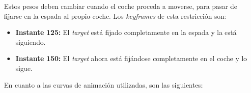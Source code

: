 \bigskip

Estos pesos deben cambiar cuando el coche proceda a moverse, para pasar de fijarse en la espada al propio coche. Los \textit{keyframes} de esta restricción son:

\begin{itemize}
    \item \textbf{Instante 125: }El \textit{target} está fijado completamente en la espada y la está siguiendo.
    \item \textbf{Instante 150: }El \textit{target} ahora está fijándose completamente en el coche y lo sigue.
\end{itemize}

\bigskip

En cuanto a las curvas de animación utilizadas, son las siguientes:


